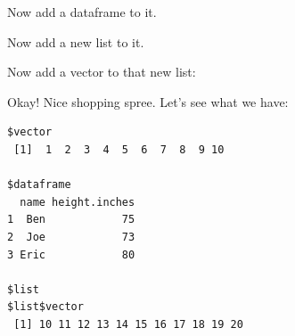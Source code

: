\documentclass[
]{book}
\newenvironment{Shaded}{\begin{snugshade}}{\end{snugshade}}
\newcommand{\AttributeTok}[1]{\textcolor[rgb]{0.77,0.63,0.00}{#1}}
\newcommand{\DecValTok}[1]{\textcolor[rgb]{0.00,0.00,0.81}{#1}}
\newcommand{\FunctionTok}[1]{\textcolor[rgb]{0.00,0.00,0.00}{#1}}
\newcommand{\NormalTok}[1]{#1}
\newcommand{\OtherTok}[1]{\textcolor[rgb]{0.56,0.35,0.01}{#1}}
\newcommand{\SpecialCharTok}[1]{\textcolor[rgb]{0.00,0.00,0.00}{#1}}
\newcommand{\StringTok}[1]{\textcolor[rgb]{0.31,0.60,0.02}{#1}}
\begin{document}
\begin{Shaded}
\end{Shaded}

Now add a dataframe to it.

\begin{Shaded}
\end{Shaded}

Now add a new list to it.

\begin{Shaded}
\end{Shaded}

Now add a vector to that new list:

\begin{Shaded}
\end{Shaded}

Okay! Nice shopping spree. Let's see what we have:

\begin{verbatim}
$vector
 [1]  1  2  3  4  5  6  7  8  9 10

$dataframe
  name height.inches
1  Ben            75
2  Joe            73
3 Eric            80

$list
$list$vector
 [1] 10 11 12 13 14 15 16 17 18 19 20
\end{verbatim}
\end{document}
